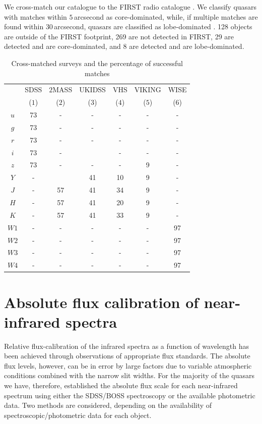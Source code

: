 We cross-match our catalogue to the FIRST radio catalogue \citep{white97}. 
We classify quasars with matches within $5$\,arcsecond as core-dominated, while, if multiple matches are found within $30$\,arcsecond, quasars are classified as lobe-dominated \citep[e.g.][]{shen11}. 
128 objects are outside of the FIRST footprint, 269 are not detected in FIRST, 29 are detected and are core-dominated, and 8 are detected and are lobe-dominated. 

\begin{table}
  \centering
  \footnotesize 
  \caption{Cross-matched surveys and the percentage of successful matches}
  \label{tab:cross-matching}
    \begin{tabular}{ccccccc} 
    \hline
     & SDSS & $2$MASS & UKIDSS & VHS & VIKING & WISE \\
     & ($1$) & ($2$) & ($3$) & ($4$) & ($5$) & ($6$) \\ 
    \hline
    $u$ & 73 & - & - & - & - & - \\
    $g$ & 73 & - & - & - & - & - \\
    $r$ & 73 & - & - & - & - & - \\
    $i$ & 73 & - &  & - & - & - \\
    $z$ & 73 & - & - & - & 9 & - \\
    $Y$ & - &  & 41 & 10 & 9 & - \\
    $J$ & - & 57 & 41 & 34 & 9 & - \\
    $H$ & - & 57 & 41 & 20 & 9 & - \\
    $K$ & - & 57 & 41 & 33 & 9 & - \\
    $W1$ & - & - & - & - & - & 97 \\
    $W2$ & - & - & - & - & - & 97 \\
    $W3$ & - & - & - & - & - & 97 \\
    $W4$ & - & - & - & - & - & 97 \\
    \hline
    \end{tabular}
\end{table} 

\section{Absolute flux calibration of near-infrared spectra}

Relative flux-calibration of the infrared spectra as a function of wavelength has been achieved through observations of appropriate flux standards. 
The absolute flux levels, however, can be in error by large factors due to variable atmospheric conditions combined with the narrow slit widths. 
For the majority of the quasars we have, therefore, established the absolute flux scale for each near-infrared spectrum using either the SDSS/BOSS spectroscopy or the available photometric data.
Two methods are considered, depending on the availability of spectroscopic/photometric data for each object. 

